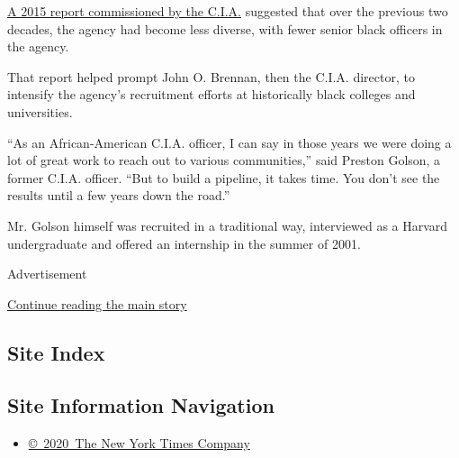 \href{https://www.cia.gov/library/reports/dls-report.pdf}{A 2015 report
commissioned by the C.I.A.} suggested that over the previous two
decades, the agency had become less diverse, with fewer senior black
officers in the agency.

That report helped prompt John O. Brennan, then the C.I.A. director, to
intensify the agency's recruitment efforts at historically black
colleges and universities.

``As an African-American C.I.A. officer, I can say in those years we
were doing a lot of great work to reach out to various communities,''
said Preston Golson, a former C.I.A. officer. ``But to build a pipeline,
it takes time. You don't see the results until a few years down the
road.''

Mr. Golson himself was recruited in a traditional way, interviewed as a
Harvard undergraduate and offered an internship in the summer of 2001.

Advertisement

\protect\hyperlink{after-bottom}{Continue reading the main story}

\hypertarget{site-index}{%
\subsection{Site Index}\label{site-index}}

\hypertarget{site-information-navigation}{%
\subsection{Site Information
Navigation}\label{site-information-navigation}}

\begin{itemize}
\tightlist
\item
  \href{https://help.nytimes.com/hc/en-us/articles/115014792127-Copyright-notice}{©~2020~The
  New York Times Company}
\end{itemize}

